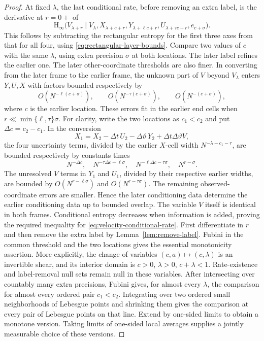 \begin{proof}
At fixed $\lambda$, the last conditional rate, before removing an
extra label, is the derivative at $r=0+$ of
\begin{equation}
 \mathrm H_\infty\bigl(V_{\lambda+r}\mid
    V_\lambda,X_{\lambda+c+r},Y_{\lambda+\ell c+r},
    U_{\lambda+\tau c+r},e_{c+\sigma}\bigr).
 \label{eq:velocity-conditional-rate}
\end{equation}
This follows by subtracting the rectangular entropy for the first
three axes from that for all four, using
\eqref{eq:rectangular-layer-bounds}.  Compare two values of $c$ with
the same $\lambda$, using extra precision $\sigma$ at both locations.
The later label refines the earlier one.  The later other-coordinate
thresholds are also finer.  In converting from the later frame to the
earlier frame, the unknown part of $V$ beyond $V_\lambda$ enters
$Y,U,X$ with factors bounded respectively by
\[
 O(N^{-\ell(c+\sigma)}),\qquad
 O(N^{-\tau(c+\sigma)}),\qquad O(N^{-(c+\sigma)}),
\]
where $c$ is the earlier location.  These errors fit in the earlier
end cells when $r\ll\min\{\ell,\tau\}\sigma$.
For clarity, write the two locations as $c_1<c_2$ and put
$\Delta c=c_2-c_1$. In the conversion
\[
 X_1=X_2-\Delta t\,U_2-\Delta\vartheta\,Y_2
                         +\Delta t\Delta\vartheta V,
\]
the four uncertainty terms, divided by the earlier $X$-cell width
$N^{-\lambda-c_1-r}$, are bounded respectively by constants times
\[
 N^{-\Delta c},\quad
 N^{-\tau\Delta c-\ell\sigma},\quad
 N^{-\ell\Delta c-\tau\sigma},\quad N^{r-\sigma}.
\]
The unresolved $V$ terms in $Y_1$ and $U_1$, divided by their
respective earlier widths, are bounded by
$O(N^{r-\ell\sigma})$ and $O(N^{r-\tau\sigma})$.
The remaining observed-coordinate errors are smaller. Hence the later conditioning
data determine the earlier conditioning data up to bounded overlap.
The variable $V$ itself is identical in both frames.  Conditional
entropy decreases when information is added, proving the required
inequality for \eqref{eq:velocity-conditional-rate}.  First differentiate
in $r$ and then remove the extra label by
Lemma~\ref{lem:remove-label}.  Fubini in the common threshold and the
two locations gives the essential monotonicity assertion. More explicitly,
the change of variables $(c,a)\mapsto(c,\lambda)$ is an invertible
shear, and its interior domain is $c>0$, $\lambda>0$, $c+\lambda<1$.
Rate-existence and label-removal null sets remain null in these variables.
After intersecting over countably many extra precisions, Fubini gives,
for almost every $\lambda$, the comparison for almost every ordered
pair $c_1<c_2$. Integrating over two ordered small neighborhoods of
Lebesgue points and shrinking them gives the comparison at every pair
of Lebesgue points on that line. Extend by one-sided limits to obtain
a monotone version. Taking limits of one-sided local averages supplies
a jointly measurable choice of these versions.


\end{proof}
